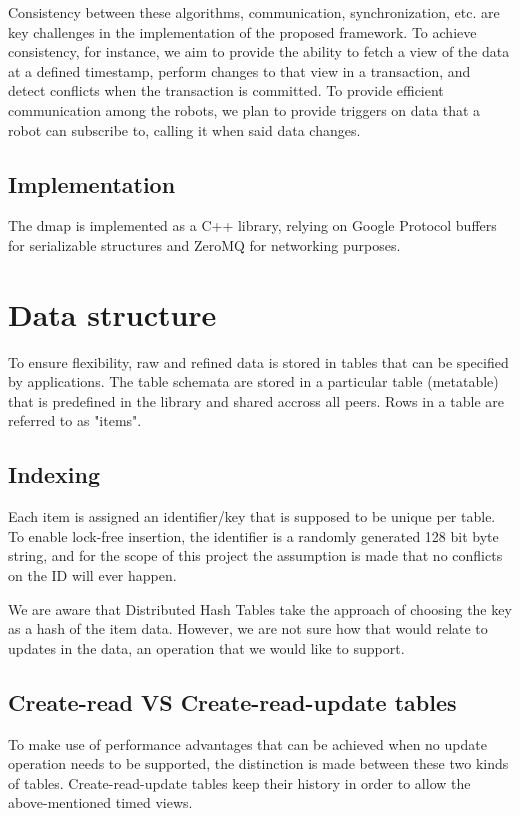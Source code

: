 \documentclass[a4paper, 10pt, conference]{ieeeconf}
\begin{document}
Consistency between these algorithms, communication, synchronization, etc. are
key challenges in the implementation of the proposed framework. To achieve
consistency, for instance, we aim to provide the ability to fetch a view of the
data at a defined timestamp, perform changes to that view in a transaction, and
detect conflicts when the transaction is committed. To provide efficient
communication among the robots, we plan to provide triggers on data that a
robot can subscribe to, calling it when said data changes.

\subsection{Implementation}

The dmap is implemented as a C++ library, relying on Google Protocol buffers
for serializable structures and ZeroMQ for networking purposes.

\section{Data structure}

To ensure flexibility, raw and refined data is stored in tables that can be 
specified by applications. The table schemata are stored in a particular table 
(metatable) that is predefined in the library and shared accross all peers. Rows
in a table are referred to as "items".

\subsection{Indexing}

Each item is assigned an identifier/key that is supposed to be unique per table.
To enable lock-free insertion, the identifier is a randomly generated 128 bit 
byte string, and for the scope of this project the assumption is made that no
conflicts on the ID will ever happen.

We are aware that Distributed Hash Tables take the approach of choosing the key
as a hash of the item data. However, we are not sure how that would relate to
updates in the data, an operation that we would like to support.

\subsection{Create-read VS Create-read-update tables}

To make use of performance advantages that can be achieved when no update
operation needs to be supported, the distinction is made between these two
kinds of tables. Create-read-update tables keep their history in order to
allow the above-mentioned timed views.
\end{document}
